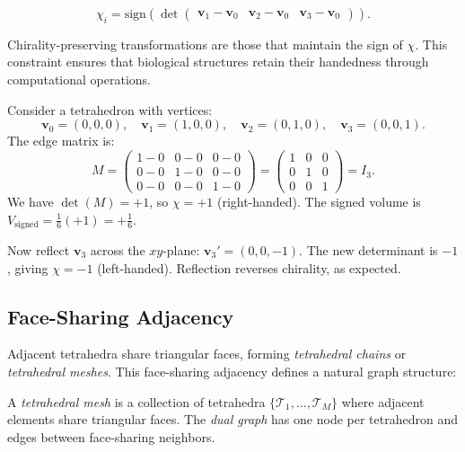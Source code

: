 \begin{equation}
\chi_i = \text{sign}\left(\det \begin{pmatrix} \mathbf{v}_1 - \mathbf{v}_0 & \mathbf{v}_2 - \mathbf{v}_0 & \mathbf{v}_3 - \mathbf{v}_0 \end{pmatrix}\right).
\end{equation}

Chirality-preserving transformations are those that maintain the sign of $\chi$.
This constraint ensures that biological structures retain their handedness
through computational operations.

\begin{example}
\label{ex:chirality}
Consider a tetrahedron with vertices:
\[
  \mathbf{v}_0 = (0,0,0), \quad
  \mathbf{v}_1 = (1,0,0), \quad
  \mathbf{v}_2 = (0,1,0), \quad
  \mathbf{v}_3 = (0,0,1).
\]
The edge matrix is:
\[
  M = \begin{pmatrix}
    1-0 & 0-0 & 0-0 \\
    0-0 & 1-0 & 0-0 \\
    0-0 & 0-0 & 1-0
  \end{pmatrix}
  = \begin{pmatrix} 1 & 0 & 0 \\ 0 & 1 & 0 \\ 0 & 0 & 1 \end{pmatrix} = I_3.
\]
We have $\det(M) = +1$, so $\chi = +1$ (right-handed). The signed volume is
$V_{\text{signed}} = \frac{1}{6}(+1) = +\frac{1}{6}$.

Now reflect $\mathbf{v}_3$ across the $xy$-plane: $\mathbf{v}_3' = (0,0,-1)$.
The new determinant is $-1$, giving $\chi = -1$ (left-handed). Reflection
reverses chirality, as expected.
\end{example}

\subsection{Face-Sharing Adjacency}

Adjacent tetrahedra share triangular faces, forming \emph{tetrahedral chains}
or \emph{tetrahedral meshes}. This face-sharing adjacency defines a natural
graph structure:

\begin{definition}
A \emph{tetrahedral mesh} is a collection of tetrahedra
$\{\mathcal{T}_1, \ldots, \mathcal{T}_M\}$ where adjacent elements share
triangular faces. The \emph{dual graph} has one node per tetrahedron and edges
between face-sharing neighbors.
\end{definition}

